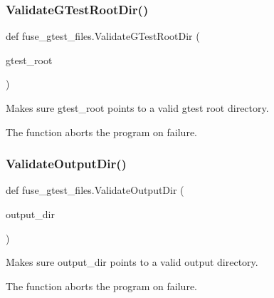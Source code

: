 \mbox{\label{namespacefuse__gtest__files_aa53690cd3c4ff01cfeea470f363f1dec}} 
\subsubsection{\texorpdfstring{ValidateGTestRootDir()}{ValidateGTestRootDir()}}
{\footnotesize\ttfamily def fuse\+\_\+gtest\+\_\+files.\+Validate\+G\+Test\+Root\+Dir (\begin{DoxyParamCaption}\item[{}]{gtest\+\_\+root }\end{DoxyParamCaption})}

\begin{DoxyVerb}Makes sure gtest_root points to a valid gtest root directory.

The function aborts the program on failure.
\end{DoxyVerb}
 \mbox{\label{namespacefuse__gtest__files_a9f584226b1f996ffff820e0751dbd458}} 
\subsubsection{\texorpdfstring{ValidateOutputDir()}{ValidateOutputDir()}}
{\footnotesize\ttfamily def fuse\+\_\+gtest\+\_\+files.\+Validate\+Output\+Dir (\begin{DoxyParamCaption}\item[{}]{output\+\_\+dir }\end{DoxyParamCaption})}

\begin{DoxyVerb}Makes sure output_dir points to a valid output directory.

The function aborts the program on failure.
\end{DoxyVerb}
 \mbox{\label{namespacefuse__gtest__files_a333eb5237899fe2f80b0c624ddba363d}} 
